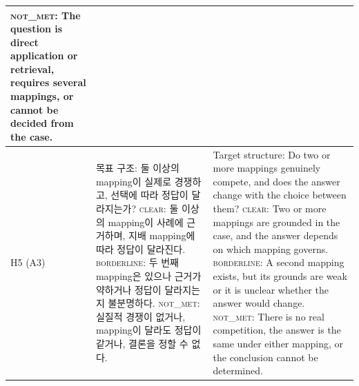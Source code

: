 \begin{table}[t]
\begin{tabular}{@{}p{}p{}p{}@{}}
\newline \textsc{not\_met}: The question is direct application or retrieval, requires several mappings, or cannot be decided from the case. \\
\midrule
H5 (A3)
& 목표 구조: 둘 이상의 mapping이 실제로 경쟁하고, 선택에 따라 정답이 달라지는가?
\newline \textsc{clear}: 둘 이상의 mapping이 사례에 근거하며, 지배 mapping에 따라 정답이 달라진다.
\newline \textsc{borderline}: 두 번째 mapping은 있으나 근거가 약하거나 정답이 달라지는지 불분명하다.
\newline \textsc{not\_met}: 실질적 경쟁이 없거나, mapping이 달라도 정답이 같거나, 결론을 정할 수 없다.
& Target structure: Do two or more mappings genuinely compete, and does the answer change with the choice between them?
\newline \textsc{clear}: Two or more mappings are grounded in the case, and the answer depends on which mapping governs.
\newline \textsc{borderline}: A second mapping exists, but its grounds are weak or it is unclear whether the answer would change.
\newline \textsc{not\_met}: There is no real competition, the answer is the same under either mapping, or the conclusion cannot be determined. \\
\bottomrule
\end{tabular}
\end{table}
